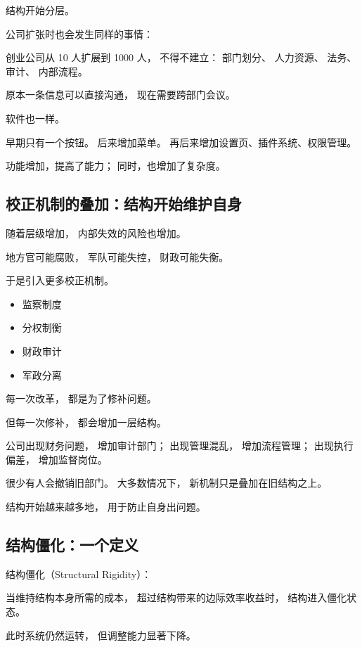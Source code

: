 \documentclass[../main.tex]{subfiles}
\begin{document}
结构开始分层。

公司扩张时也会发生同样的事情：

\begin{examplebox}
	创业公司从 10 人扩展到 1000 人，
	不得不建立：
	部门划分、
	人力资源、
	法务、
	审计、
	内部流程。
	
	原本一条信息可以直接沟通，
	现在需要跨部门会议。
\end{examplebox}

软件也一样。

早期只有一个按钮。
后来增加菜单。
再后来增加设置页、插件系统、权限管理。

功能增加，提高了能力；
同时，也增加了复杂度。

\subsection{校正机制的叠加：结构开始维护自身}

随着层级增加，
内部失效的风险也增加。

地方官可能腐败，
军队可能失控，
财政可能失衡。

于是引入更多校正机制。

\begin{itemize}
	\item 监察制度
	\item 分权制衡
	\item 财政审计
	\item 军政分离
\end{itemize}

每一次改革，
都是为了修补问题。

但每一次修补，
都会增加一层结构。

\begin{examplebox}
	公司出现财务问题，
	增加审计部门；
	出现管理混乱，
	增加流程管理；
	出现执行偏差，
	增加监督岗位。
	
	很少有人会撤销旧部门。
	大多数情况下，
	新机制只是叠加在旧结构之上。
\end{examplebox}

结构开始越来越多地，
用于防止自身出问题。

\subsection{结构僵化：一个定义}

\begin{definitionbox}
	结构僵化（Structural Rigidity）：
	
	当维持结构本身所需的成本，
	超过结构带来的边际效率收益时，
	结构进入僵化状态。
	
	此时系统仍然运转，
	但调整能力显著下降。
\end{definitionbox}
\end{document}
